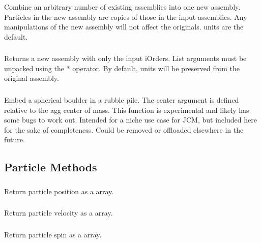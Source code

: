 \subsubsection{}
Combine an arbitrary number of existing assemblies into one new assembly. Particles in the new assembly are copies of those in the input assemblies. Any manipulations of the new assembly will not affect the originals. \pkd{} units are the default.

\subsubsection{}
Returns a new assembly with only the input iOrders. List arguments must be unpacked using the * operator. By default, units will be preserved from the original assembly.

\subsubsection{}
Embed a spherical boulder in a rubble pile. The center argument is defined relative to the agg center of mass. This function is experimental and likely has some bugs to work out. Intended for a niche use case for JCM, but included here for the sake of completeness. Could be removed or offloaded elsewhere in the future.



\subsection{Particle Methods}

\subsubsection{}
Return particle position as a \pkd{} array.

\subsubsection{}
Return particle velocity as a  array.

\subsubsection{}
Return particle spin as a  array.

